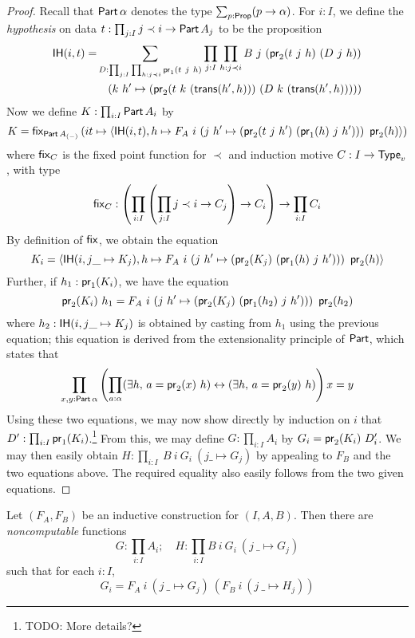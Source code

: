 \begin{proof}
  Recall that \( \operatorname{\mathsf{Part}} \alpha \) denotes the type \( \sum_{p: \mathsf{Prop}} (p \to \alpha) \).
  For \( i : I \), we define the \emph{hypothesis} on data \( t : \prod_{j : I} j \prec i \to \operatorname{\mathsf{Part}} A_j \) to be the proposition
  \begin{align*}
    \newoperator{IH}(i, t) = &\sum_{D : \prod_{j : I} \prod_{h : j \prec i} \pr_1(t\ j\ h)} \prod_{j : I} \prod_{h : j \prec i} B\ j\ (\pr_2(t\ j\ h)\ (D\ j\ h))\\
    &\quad(k\ h' \mapsto (\pr_2(t\ k\ (\newoperator{trans}(h',h)))\ (D\ k\ (\newoperator{trans}(h',h)))))
  \end{align*}
  Now we define \( K : \prod_{i : I} \operatorname{\mathsf{Part}} A_i \) by
  \[ K = \newoperator{fix}_{\Part A_{(-)}} \left( i t \mapsto \left\langle \newoperator{IH}(i, t), h \mapsto F_A\ i\ (j\ h' \mapsto (\pr_2(t\ j\ h')\ (\pr_1(h)\ j\ h')))\ \pr_2(h) \right\rangle \right) \]
  where \( \operatorname{\mathsf{fix}}_C \) is the fixed point function for \( \prec \) and induction motive \( C : I \to \mathsf{Type}_v \), with type
  \[ \operatorname{\mathsf{fix}}_C : \left( \prod_{i : I} \left( \prod_{j : I} j \prec i \to C_j \right) \to C_i \right) \to \prod_{i : I} C_i \]
  By definition of \( \operatorname{\mathsf{fix}} \), we obtain the equation
  \[ K_i = \left\langle \newoperator{IH}(i, j \_ \mapsto K_j), h \mapsto F_A\ i\ (j\ h' \mapsto (\pr_2(K_j)\ (\pr_1(h)\ j\ h')))\ \pr_2(h) \right\rangle \]
  Further, if \( h_1 : \operatorname{\mathsf{pr}}_1(K_i) \), we have the equation
  \[ \operatorname{\mathsf{pr}}_2(K_i)\ h_1 = F_A\ i\ (j\ h' \mapsto (\operatorname{\mathsf{pr}}_2(K_j)\ (\operatorname{\mathsf{pr}}_1(h_2)\ j\ h')))\ \operatorname{\mathsf{pr}}_2(h_2) \]
  where \( h_2 : \operatorname{\mathsf{IH}}(i, j \_ \mapsto K_j) \) is obtained by casting from \( h_1 \) using the previous equation; this equation is derived from the extensionality principle of \( \operatorname{\mathsf{Part}} \), which states that
  \[ \prod_{x, y : \operatorname{\mathsf{Part}} \alpha} \left( \prod_{a : \alpha} (\exists h,\, a = \operatorname{\mathsf{pr}}_2(x)\ h) \leftrightarrow (\exists h,\, a = \operatorname{\mathsf{pr}}_2(y)\ h) \right) x = y \]
  Using these two equations, we may now show directly by induction on \( i \) that \( D' : \prod_{i : I} \operatorname{\mathsf{pr}}_1(K_i) \).\footnote{TODO: More details?}
  From this, we may define \( G : \prod_{i : I} A_i \) by \( G_i = \operatorname{\mathsf{pr}}_2(K_i)\ D'_i \).
  We may then easily obtain \( H : \prod_{i : I}\ B\ i\ G_i\ (j \_ \mapsto G_j) \) by appealing to \( F_B \) and the two equations above.
  The required equality also easily follows from the two given equations.
\end{proof}
\begin{theorem}
  \label{prop:IC.fix}
  Let \( (F_A, F_B) \) be an inductive construction for \( (I, A, B) \).
  Then there are \emph{noncomputable} functions
  \[ G : \prod_{i : I} A_i;\quad H : \prod_{i : I} B\ i\ G_i\ (j\ \_ \mapsto G_j) \]
  such that for each \( i : I \),
  \[ G_i = F_A\ i\ (j\ \_ \mapsto G_j)\ (F_B\ i\ (j\ \_ \mapsto H_j)) \]
\end{theorem}
